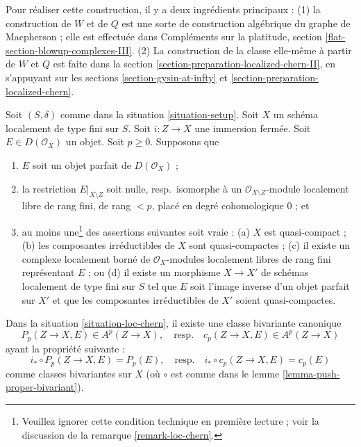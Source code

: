 \medskip\noindent
Pour réaliser cette construction, il y a deux ingrédients principaux : (1) la construction de
$W$ et de $Q$ est une sorte de construction algébrique du graphe de Macpherson ; elle
est effectuée dans Compléments sur la platitude, section \ref{flat-section-blowup-complexes-III}.
(2) La construction de la classe elle-même à partir de $W$ et $Q$ est faite dans la
section \ref{section-preparation-localized-chern-II}, en s'appuyant sur les
sections \ref{section-gysin-at-infty} et
\ref{section-preparation-localized-chern}.

\begin{situation}
\label{situation-loc-chern}
Soit $(S, \delta)$ comme dans la situation \ref{situation-setup}. Soit $X$ un schéma
localement de type fini sur $S$. Soit $i : Z \to X$ une immersion fermée.
Soit $E \in D(\mathcal{O}_X)$ un objet. Soit $p \geq 0$. Supposons que
\begin{enumerate}
\item $E$ soit un objet parfait de $D(\mathcal{O}_X)$ ;
\item la restriction $E|_{X \setminus Z}$ soit nulle, resp.\ isomorphe à un
$\mathcal{O}_{X \setminus Z}$-module localement libre de rang fini, de rang $< p$,
placé en degré cohomologique $0$ ; et
\item au moins une\footnote{Veuillez ignorer cette condition technique en
première lecture ; voir la discussion de la remarque \ref{remark-loc-chern}.}
des assertions suivantes soit vraie :
(a) $X$ est quasi-compact ;
(b) les composantes irréductibles de $X$ sont quasi-compactes ;
(c) il existe un complexe localement borné de
$\mathcal{O}_X$-modules localement libres de rang fini représentant $E$ ; ou
(d) il existe un morphisme $X \to X'$ de schémas localement de type fini
sur $S$ tel que $E$ soit l'image inverse d'un objet parfait sur $X'$ et que
les composantes irréductibles de $X'$ soient quasi-compactes.
\end{enumerate}
\end{situation}

\begin{lemma}
\label{lemma-independent-loc-chern}
Dans la situation \ref{situation-loc-chern}, il existe une classe bivariante canonique
$$
P_p(Z \to X, E) \in A^p(Z \to X),
\quad\text{resp.}\quad
c_p(Z \to X, E) \in A^p(Z \to X)
$$
ayant la propriété suivante :
\begin{equation}
\label{equation-defining-property-localized-classes}
i_* \circ P_p(Z \to X, E) = P_p(E),
\quad\text{resp.}\quad
i_* \circ c_p(Z \to X, E) = c_p(E)
\end{equation}
comme classes bivariantes sur $X$ (où $\circ$ est comme dans le
lemme \ref{lemma-push-proper-bivariant}).
\end{lemma}

